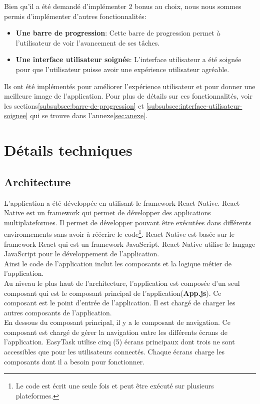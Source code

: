 \documentclass[12pt]{article}
\begin{document}
        Bien qu'il a été demandé d'implémenter 2 bonus au choix, nous nous sommes permis d'implémenter d'autres fonctionnalités:
        \begin{itemize}
            \item \textbf{Une barre de progression}: Cette barre de progression permet à l'utilisateur de voir l'avancement de ses tâches.
            \item \textbf{Une interface utilisateur soignée}: L'interface utilisateur a été soignée pour que l'utilisateur puisse avoir une expérience utilisateur agréable.
        \end{itemize}
        Ils ont été implémentés pour améliorer l'expérience utilisateur et pour donner une meilleure image de l'application. Pour
        plus de détails sur ces fonctionnalités, voir les sections\ref{subsubsec:barre-de-progression} et \ref{subsubsec:interface-utilisateur-soignee} qui se
         trouve dans l'annexe\ref{sec:anexe}.

        \section{Détails techniques}\label{sec:details-techniques}

        \subsection{Architecture}\label{subsec:architecture}
        L'application a été développée en utilisant le framework React Native. React Native est un framework qui permet de développer des applications multiplateformes.
        Il permet de développer pouvant être exécutées dans différents environnements sans avoir à réécrire le code\footnote{Le code est écrit une seule fois et peut être exécuté sur plusieurs plateformes.}.
        React Native est basée sur le framework React qui est un framework JavaScript. React Native utilise le langage JavaScript pour le développement de l'application.\\
        Ainsi le code de l'application inclut les composants et la logique métier de l'application.\\

        Au niveau le plus haut de l'architecture, l'application est composée d'un seul composant qui est le composant principal de l'application(\textbf{App.js}).
        Ce composant est le point d'entrée de l'application. Il est chargé de charger les autres composants de l'application.\\
        En dessous du composant principal, il y a le composant de navigation. Ce composant est chargé de gérer la navigation entre les différents écrans de l'application.
        EasyTask utilise cinq (5) écrans principaux dont trois ne sont accessibles que pour les utilisateurs connectés. Chaque écrans charge
        les composants dont il a besoin pour fonctionner.\\
\end{document}
